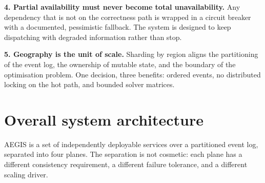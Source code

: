 \documentclass[11pt,a4paper]{article}
\newcommand{\dec}[2]{\textbf{#1} \textemdash{} #2}
\begin{document}
\begin{decbox}
\dec{4. Partial availability must never become total unavailability.}{Any
dependency that is not on the correctness path is wrapped in a circuit
breaker with a documented, pessimistic fallback. The system is designed to
keep dispatching with degraded information rather than stop.}
\end{decbox}

\begin{decbox}
\dec{5. Geography is the unit of scale.}{Sharding by region aligns the
partitioning of the event log, the ownership of mutable state, and the
boundary of the optimisation problem. One decision, three benefits: ordered
events, no distributed locking on the hot path, and bounded solver matrices.}
\end{decbox}

\section{Overall system architecture}

AEGIS is a set of independently deployable services over a partitioned event
log, separated into four planes. The separation is not cosmetic: each plane
has a different consistency requirement, a different failure tolerance, and a
different scaling driver.
\end{document}
